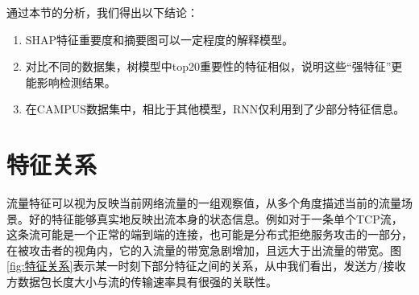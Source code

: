 
通过本节的分析，我们得出以下结论：
\begin{enumerate}
  \item SHAP特征重要度和摘要图可以一定程度的解释模型。
  \item 对比不同的数据集，树模型中top20重要性的特征相似，说明这些“强特征”更能影响检测结果。
  \item 在CAMPUS数据集中，相比于其他模型，RNN仅利用到了少部分特征信息。
\end{enumerate}




\section{特征关系}
流量特征可以视为反映当前网络流量的一组观察值，从多个角度描述当前的流量场景。好的特征能够真实地反映出流本身的状态信息。例如对于一条单个TCP流，这条流可能是一个正常的端到端的连接，也可能是分布式拒绝服务攻击的一部分，在被攻击者的视角内，它的入流量的带宽急剧增加，且远大于出流量的带宽。图\ref{fig:特征关系}表示某一时刻下部分特征之间的关系，从中我们看出，发送方/接收方数据包长度大小与流的传输速率具有很强的关联性。

